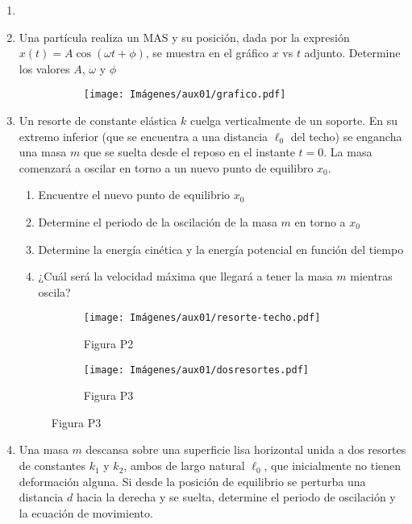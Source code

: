 \documentclass[letterpaper,11pt]{article}
\begin{document}
\vspace{-1cm}
\begin{enumerate}\setlength{\itemsep}{0.4cm}

\item[]

\item Una partícula realiza un MAS y su posición, dada por la expresión $x(t) = A\cos{(\omega t + \phi)}$, se muestra en el gráfico $x$ vs $t$ adjunto. Determine los valores $A$, $\omega$ y $\phi$ 
\begin{figure}[H]
    \centering
    \begin{subfigure}[t]{0.49\linewidth}
        \centering
        \texttt{[image: Imágenes/aux01/grafico.pdf]}
    \end{subfigure}
\end{figure}
\item Un resorte de constante elástica $k$ cuelga verticalmente de un soporte. En su extremo inferior (que se encuentra a una distancia $\ell_0$ del techo) se engancha una masa $m$ que se suelta desde el reposo en el instante $t=0$. La masa comenzará a oscilar en torno a un nuevo punto de equilibro $x_0$.
    \begin{enumerate}
        \item Encuentre el nuevo punto de equilibrio $x_0$
        \item Determine el periodo de la oscilación de la masa $m$ en torno a $x_0$
        \item Determine la energía cinética y la energía potencial en función del tiempo
        \item ¿Cuál será la velocidad máxima que llegará a tener la masa $m$ mientras oscila?
    \end{enumerate}

\begin{figure}[H]
    \centering
    \begin{subfigure}[t]{0.49\linewidth}
        \centering
        \texttt{[image: Imágenes/aux01/resorte-techo.pdf]}
        \caption*{Figura P2}
    \end{subfigure}
    \begin{subfigure}[t]{0.49\linewidth}
        \centering
        \texttt{[image: Imágenes/aux01/dosresortes.pdf]}
        \caption*{Figura P3}
    \end{subfigure}
\end{figure}
\item Una masa $m$ descansa sobre una superficie lisa horizontal unida a dos resortes de constantes $k_1$ y $k_2$, ambos de largo natural $\ell_0$, que inicialmente no tienen deformación alguna. Si desde la posición de equilibrio se perturba una distancia $d$ hacia la derecha y se suelta, determine el periodo de oscilación y la ecuación de movimiento.
\end{enumerate}
\end{document}
